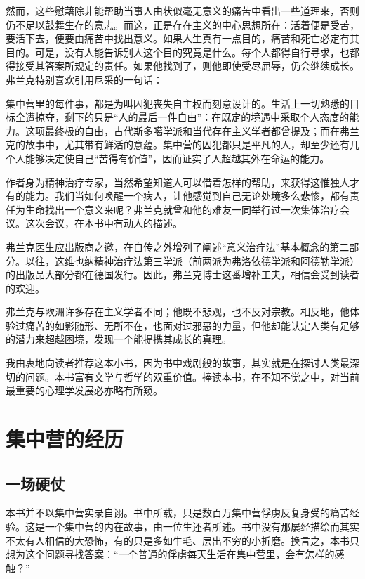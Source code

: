 \documentclass[11pt,oneside]{book}
\begin{document}
\begin{common-format}
然而，这些慰藉除非能帮助当事人由状似毫无意义的痛苦中看出一些道理来，否则仍不足以鼓舞生存的意志。而这，正是存在主义的中心思想所在：活着便是受苦，要活下去，便要由痛苦中找出意义。如果人生真有一点目的，痛苦和死亡必定有其目的。可是，没有人能告诉别人这个目的究竟是什么。每个人都得自行寻求，也都得接受其答案所规定的责任。如果他找到了，则他即使受尽屈辱，仍会继续成长。弗兰克特别喜欢引用尼采的一句话：

集中营里的每件事，都是为叫囚犯丧失自主权而刻意设计的。生活上一切熟悉的目标全遭掠夺，剩下的只是“人的最后一件自由”：在既定的境遇中采取个人态度的能力。这项最终极的自由，古代斯多噶学派和当代存在主义学者都曾提及；而在弗兰克的故事中，尤其带有鲜活的意蕴。集中营的囚犯都只是平凡的人，却至少还有几个人能够决定使自己“苦得有价值”，因而证实了人超越其外在命运的能力。

作者身为精神治疗专家，当然希望知道人可以借着怎样的帮助，来获得这惟独人才有的能力。我们当如何唤醒一个病人，让他感觉到自己无论处境多么悲惨，都有责任为生命找出一个意义来呢？弗兰克就曾和他的难友一同举行过一次集体治疗会议。这次会议，在本书中有动人的描述。

弗兰克医生应出版商之邀，在自传之外增列了阐述“意义治疗法”基本概念的第二部分。以往，这维也纳精神治疗法第三学派（前两派为弗洛依德学派和阿德勒学派）的出版品大部分都在德国发行。因此，弗兰克博士这番增补工夫，相信会受到读者的欢迎。

弗兰克与欧洲许多存在主义学者不同；他既不悲观，也不反对宗教。相反地，他体验过痛苦的如影随形、无所不在，也面对过邪恶的力量，但他却能认定人类有足够的潜力来超越困境，发现一个能提携其成长的真理。

我由衷地向读者推荐这本小书，因为书中戏剧般的故事，其实就是在探讨人类最深切的问题。本书富有文学与哲学的双重价值。捧读本书，在不知不觉之中，对当前最重要的心理学发展必亦略有所窥。


\chapter{集中营的经历}
\section{一场硬仗}
本书并不以集中营实录自诩。书中所载，只是数百万集中营俘虏反复身受的痛苦经验。这是一个集中营的内在故事，由一位生还者所述。书中没有那屡经描绘而其实不太有人相信的大恐怖，有的只是多如牛毛、层出不穷的小折磨。换言之，本书只想为这个问题寻找答案：“一个普通的俘虏每天生活在集中营里，会有怎样的感触？”


\end{common-format}
\end{document}
